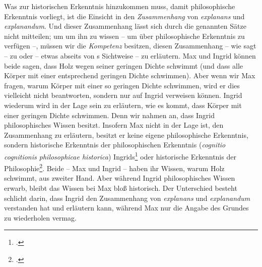 Was zur historischen Erkenntnis hinzukommen muss, damit philosophische
Erkenntnis vorliegt, ist die Einsicht in den \emph{Zusammenhang} von
\emph{explanans} und \emph{explanandum}. Und dieser Zusammenhang lässt sich
durch die genannten Sätze nicht mitteilen; um um ihn zu wissen -- um über
philosophische Erkenntnis zu verfügen --, müssen wir die \emph{Kompetenz}
besitzen, diesen Zusammenhang -- wie
 sagt -- zu 
oder -- etwas abseits von s Sichtweise
-- zu erläutern. Max und Ingrid können beide sagen, dass Holz wegen seiner
geringen Dichte schwimmt (und dass alle Körper mit einer entsprechend geringen Dichte
schwimmen). Aber wenn wir Max fragen, warum Körper mit einer so geringen Dichte
schwimmen, wird er dies vielleicht nicht beantworten, sondern nur auf Ingrid
verweisen können. Ingrid wiederum wird in der Lage sein zu erläutern, wie es
kommt, dass Körper mit einer geringen Dichte schwimmen. Denn wir nahmen an, dass Ingrid philosophisches
Wissen besitzt. Insofern Max nicht in der Lage ist,
den Zusammenhang zu erläutern, besitzt er keine eigene philosophische
Erkenntnis, sondern historische Erkenntnis der philosophischen Erkenntnis
(\emph{cognitio cognitionis philosophicae historica})
Ingrids\footcite[Vgl.][\S~8]{Wolff:Discursuspraeliminarisdephilosophiaingenere1996}
oder historische Erkenntnis der
Philosophie\footcite[Vgl.][\S~50]{Wolff:Discursuspraeliminarisdephilosophiaingenere1996}.
Beide -- Max und Ingrid -- haben ihr Wissen, warum Holz schwimmt, aus zweiter
Hand. Aber während Ingrid philosophisches Wissen erwarb, bleibt das Wissen bei
Max bloß historisch. Der Unterschied besteht schlicht darin, dass Ingrid den
Zusammenhang von \emph{explanans} und \emph{explanandum} verstanden hat und
erläutern kann, während Max nur die Angabe des Grundes zu wiederholen vermag.



